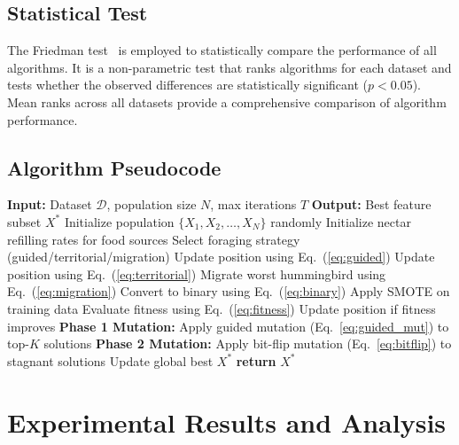 \documentclass[conference,twocolumn]{IEEEtran}
\begin{document}
\subsection{Statistical Test}

The Friedman test~\cite{friedman1937use} is employed to statistically compare the performance of all algorithms. It is a non-parametric test that ranks algorithms for each dataset and tests whether the observed differences are statistically significant ($p < 0.05$). Mean ranks across all datasets provide a comprehensive comparison of algorithm performance.

\subsection{Algorithm Pseudocode}

\begin{algorithm}[H]
\caption{2M-AHA for Feature Selection}
\label{alg:2maha}
\begin{algorithmic}[1]
\STATE \textbf{Input:} Dataset $\mathcal{D}$, population size $N$, max iterations $T$
\STATE \textbf{Output:} Best feature subset $X^*$
\STATE Initialize population $\{X_1, X_2, \ldots, X_N\}$ randomly
\STATE Initialize nectar refilling rates for food sources
        \STATE Select foraging strategy (guided/territorial/migration)
            \STATE Update position using Eq.~(\ref{eq:guided})
            \STATE Update position using Eq.~(\ref{eq:territorial})
        \ELSE
            \STATE Migrate worst hummingbird using Eq.~(\ref{eq:migration})
        \ENDIF
        \STATE Convert to binary using Eq.~(\ref{eq:binary})
        \STATE Apply SMOTE on training data
        \STATE Evaluate fitness using Eq.~(\ref{eq:fitness})
        \STATE Update position if fitness improves
    \ENDFOR
    \STATE \textbf{Phase 1 Mutation:} Apply guided mutation (Eq.~\ref{eq:guided_mut}) to top-$K$ solutions
    \STATE \textbf{Phase 2 Mutation:} Apply bit-flip mutation (Eq.~\ref{eq:bitflip}) to stagnant solutions
    \STATE Update global best $X^*$
\ENDFOR
\STATE \textbf{return} $X^*$
\end{algorithmic}
\end{algorithm}

\section{Experimental Results and Analysis}\label{sec:results}
\end{document}
